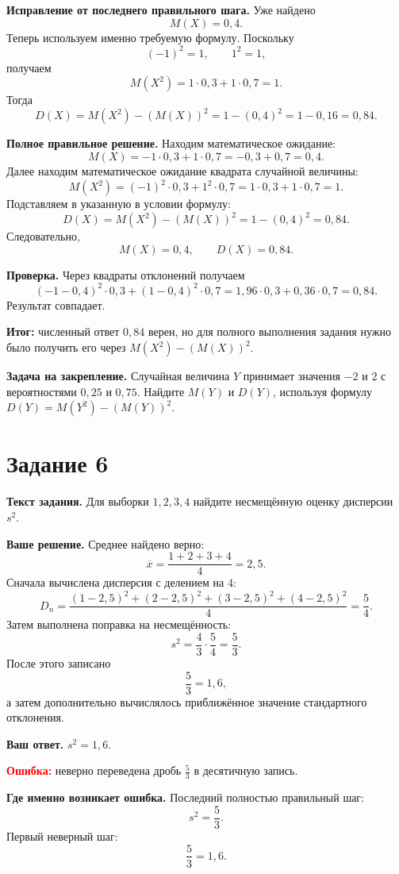 \documentclass[12pt,a4paper]{article}
\begin{document}
\textbf{Исправление от последнего правильного шага.}
Уже найдено
\[
M(X)=0{,}4.
\]
Теперь используем именно требуемую формулу. Поскольку
\[
(-1)^2=1,\qquad 1^2=1,
\]
получаем
\[
M(X^2)=1\cdot0{,}3+1\cdot0{,}7=1.
\]
Тогда
\[
D(X)=M(X^2)-(M(X))^2=1-(0{,}4)^2=1-0{,}16=0{,}84.
\]

\textbf{Полное правильное решение.}
Находим математическое ожидание:
\[
M(X)=-1\cdot0{,}3+1\cdot0{,}7=-0{,}3+0{,}7=0{,}4.
\]
Далее находим математическое ожидание квадрата случайной величины:
\[
M(X^2)=(-1)^2\cdot0{,}3+1^2\cdot0{,}7
=1\cdot0{,}3+1\cdot0{,}7=1.
\]
Подставляем в указанную в условии формулу:
\[
D(X)=M(X^2)-(M(X))^2=1-(0{,}4)^2=0{,}84.
\]
Следовательно,
\[
M(X)=0{,}4,\qquad D(X)=0{,}84.
\]

\textbf{Проверка.}
Через квадраты отклонений получаем
\[
(-1-0{,}4)^2\cdot0{,}3+(1-0{,}4)^2\cdot0{,}7
=1{,}96\cdot0{,}3+0{,}36\cdot0{,}7
=0{,}84.
\]
Результат совпадает.

\textcolor{teal!60!black}{\textbf{Итог:}} численный ответ $0{,}84$ верен, но для полного выполнения задания нужно было получить его через $M(X^2)-(M(X))^2$.

\textbf{Задача на закрепление.}
Случайная величина $Y$ принимает значения $-2$ и $2$ с вероятностями $0{,}25$ и $0{,}75$. Найдите $M(Y)$ и $D(Y)$, используя формулу $D(Y)=M(Y^2)-(M(Y))^2$.

\newpage
{}\label{task:6}
\section*{Задание 6}

\textbf{Текст задания.}
Для выборки $1,2,3,4$ найдите несмещённую оценку дисперсии $s^2$.

\textbf{Ваше решение.}
Среднее найдено верно:
\[
\overline{x}=\frac{1+2+3+4}{4}=2{,}5.
\]
Сначала вычислена дисперсия с делением на $4$:
\[
D_n=\frac{(1-2{,}5)^2+(2-2{,}5)^2+(3-2{,}5)^2+(4-2{,}5)^2}{4}=\frac54.
\]
Затем выполнена поправка на несмещённость:
\[
s^2=\frac{4}{3}\cdot\frac54=\frac53.
\]
После этого записано
\[
\frac53=1{,}6,
\]
а затем дополнительно вычислялось приближённое значение стандартного отклонения.

\textbf{Ваш ответ.}
$s^2=1{,}6$.

\textcolor{red}{\textbf{Ошибка:}} неверно переведена дробь $\frac53$ в десятичную запись.

\textbf{Где именно возникает ошибка.}
Последний полностью правильный шаг:
\[
s^2=\frac53.
\]
Первый неверный шаг:
\[
\frac53=1{,}6.
\]
\end{document}
